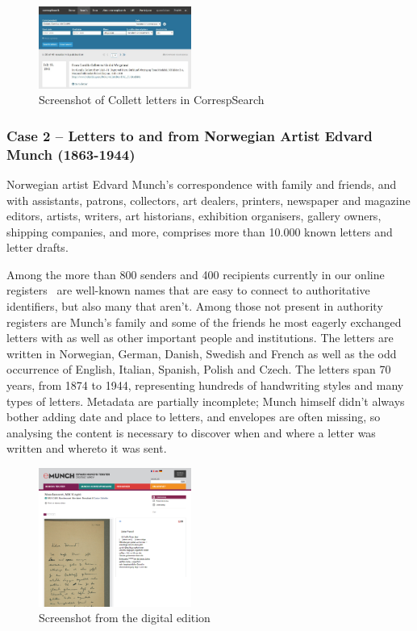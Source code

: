 \documentclass[runningheads]{llncs}
\begin{document}
\begin{figure}[h!]
\centering
\includegraphics[width=50mm]{CC_CS.jpg}
\caption{Screenshot of Collett letters in CorrespSearch} \label{fig4}
\end{figure}

\subsubsection{Case 2 -- Letters to and from Norwegian Artist Edvard
Munch (1863-1944)}
Norwegian artist Edvard Munch's correspondence with family and friends,
and with assistants, patrons, collectors, art dealers, printers,
newspaper and magazine editors, artists, writers, art historians,
exhibition organisers, gallery owners, shipping companies, and more,
comprises more than 10.000 known letters and letter drafts.

Among the more than 800 senders and 400 recipients currently in our
online registers~\cite{ref_emunch} are well-known names that
are easy to connect to authoritative identifiers, but also many that
aren't. Among those not present in authority registers are Munch's
family and some of the friends he most eagerly exchanged letters with as
well as other important people and institutions. The letters are written
in Norwegian, German, Danish, Swedish and French as well as the odd
occurrence of English, Italian, Spanish, Polish and Czech. The letters
span 70 years, from 1874 to 1944, representing hundreds of handwriting
styles and many types of letters. Metadata are partially incomplete;
Munch himself didn't always bother adding date and place to letters, and
envelopes are often missing, so analysing the content is necessary to
discover when and where a letter was written and whereto it was sent.

\begin{figure}[h!]
\centering
\includegraphics[width=50mm]{emunch.png}
\caption{Screenshot from the digital edition} \label{fig5}
\end{figure}
\end{document}
